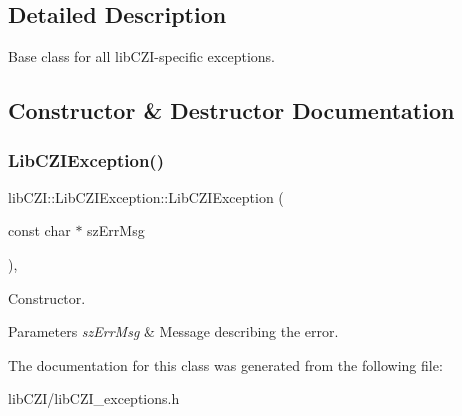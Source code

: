 \subsection{Detailed Description}
Base class for all lib\+C\+Z\+I-\/specific exceptions. 

\subsection{Constructor \& Destructor Documentation}
\mbox{\label{classlib_c_z_i_1_1_lib_c_z_i_exception_ab6a09f2d1b399b1aa37f2ea75b80d6f8}} 
\subsubsection{\texorpdfstring{Lib\+C\+Z\+I\+Exception()}{LibCZIException()}}
{\footnotesize\ttfamily lib\+C\+Z\+I\+::\+Lib\+C\+Z\+I\+Exception\+::\+Lib\+C\+Z\+I\+Exception (\begin{DoxyParamCaption}\item[{const char $\ast$}]{sz\+Err\+Msg }\end{DoxyParamCaption})\hspace{0.3cm}{\ttfamily [inline]}, {\ttfamily [explicit]}}

Constructor. 
\begin{DoxyParams}{Parameters}
{\em sz\+Err\+Msg} & Message describing the error. \\
\hline
\end{DoxyParams}


The documentation for this class was generated from the following file\+:\begin{DoxyCompactItemize}
\item 
lib\+C\+Z\+I/lib\+C\+Z\+I\+\_\+exceptions.\+h\end{DoxyCompactItemize}
